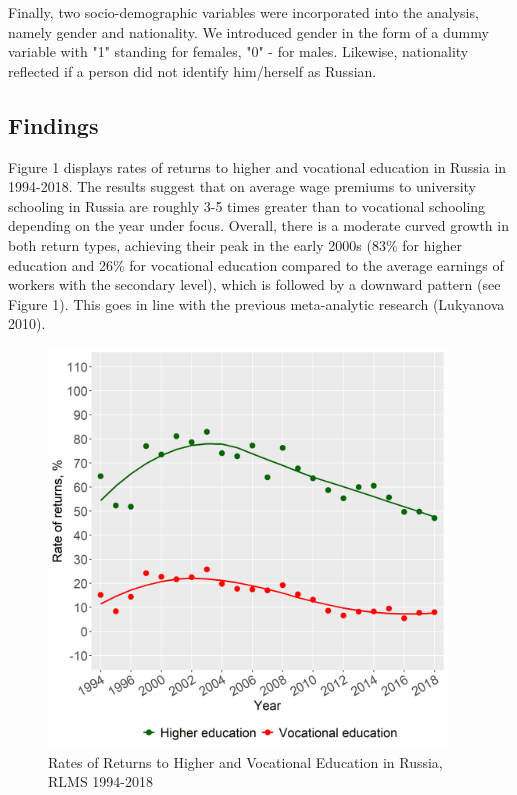 \documentclass[12pt,a4paper]{article}
\begin{document}
Finally, two socio-demographic variables were incorporated into the analysis, namely gender and nationality. We introduced gender in the form of a dummy variable with "1" standing for females, "0" - for males. Likewise, nationality reflected if a person did not identify him/herself as Russian.

\subsection*{Findings}

Figure 1 displays rates of returns to higher and vocational education in Russia in 1994-2018. The results suggest that on average wage premiums to university schooling in Russia are roughly 3-5 times greater than to vocational schooling depending on the year under focus. Overall, there is a moderate curved growth in both return types, achieving their peak in the early 2000s (83\% for higher education and 26\% for vocational education compared to the average earnings of workers with the secondary level), which is followed by a downward pattern (see Figure 1). This goes in line with the previous meta-analytic research (Lukyanova 2010).
\\



\begin{figure}[H]
\begin{center}
  \centering
  \includegraphics[width=300pt]{p1.png}
  \caption{Rates of Returns to Higher and Vocational Education in Russia, RLMS 1994-2018}\label{fig:1}
\end{center}
\end{figure}
\end{document}

